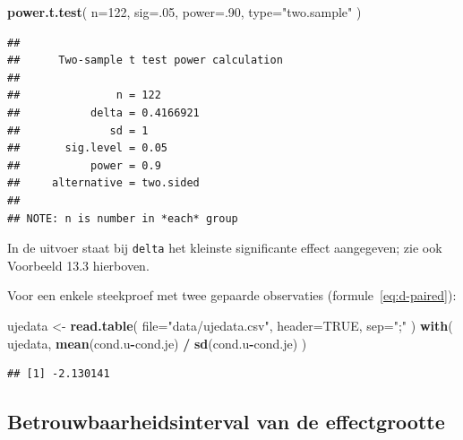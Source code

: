 \documentclass[
]{book}
\newenvironment{Shaded}{\begin{snugshade}}{\end{snugshade}}
\newcommand{\AttributeTok}[1]{\textcolor[rgb]{0.13,0.29,0.53}{#1}}
\newcommand{\ConstantTok}[1]{\textcolor[rgb]{0.56,0.35,0.01}{#1}}
\newcommand{\DecValTok}[1]{\textcolor[rgb]{0.00,0.00,0.81}{#1}}
\newcommand{\FunctionTok}[1]{\textcolor[rgb]{0.13,0.29,0.53}{\textbf{#1}}}
\newcommand{\NormalTok}[1]{#1}
\newcommand{\OtherTok}[1]{\textcolor[rgb]{0.56,0.35,0.01}{#1}}
\newcommand{\SpecialCharTok}[1]{\textcolor[rgb]{0.81,0.36,0.00}{\textbf{#1}}}
\newcommand{\StringTok}[1]{\textcolor[rgb]{0.31,0.60,0.02}{#1}}
\begin{document}
\begin{Shaded}
\begin{Highlighting}[]
\FunctionTok{power.t.test}\NormalTok{( }\AttributeTok{n=}\DecValTok{122}\NormalTok{, }\AttributeTok{sig=}\NormalTok{.}\DecValTok{05}\NormalTok{, }\AttributeTok{power=}\NormalTok{.}\DecValTok{90}\NormalTok{, }\AttributeTok{type=}\StringTok{"two.sample"}\NormalTok{ )}
\end{Highlighting}
\end{Shaded}

\begin{verbatim}
## 
##      Two-sample t test power calculation 
## 
##               n = 122
##           delta = 0.4166921
##              sd = 1
##       sig.level = 0.05
##           power = 0.9
##     alternative = two.sided
## 
## NOTE: n is number in *each* group
\end{verbatim}

In de uitvoer staat bij \texttt{delta} het kleinste significante effect
aangegeven; zie ook Voorbeeld 13.3 hierboven.

Voor een enkele steekproef met twee gepaarde observaties
(formule~\eqref{eq:d-paired}):

\begin{Shaded}
\begin{Highlighting}[]
\NormalTok{ujedata }\OtherTok{\textless{}{-}} \FunctionTok{read.table}\NormalTok{( }\AttributeTok{file=}\StringTok{"data/ujedata.csv"}\NormalTok{, }\AttributeTok{header=}\ConstantTok{TRUE}\NormalTok{, }\AttributeTok{sep=}\StringTok{";"}\NormalTok{ )}
\FunctionTok{with}\NormalTok{( ujedata, }\FunctionTok{mean}\NormalTok{(cond.u}\SpecialCharTok{{-}}\NormalTok{cond.je) }\SpecialCharTok{/} \FunctionTok{sd}\NormalTok{(cond.u}\SpecialCharTok{{-}}\NormalTok{cond.je) )}
\end{Highlighting}
\end{Shaded}

\begin{verbatim}
## [1] -2.130141
\end{verbatim}

\subsection{Betrouwbaarheidsinterval van de effectgrootte}\label{sec:betrouwbaarheidsinterval-effectgrootte}
\end{document}
